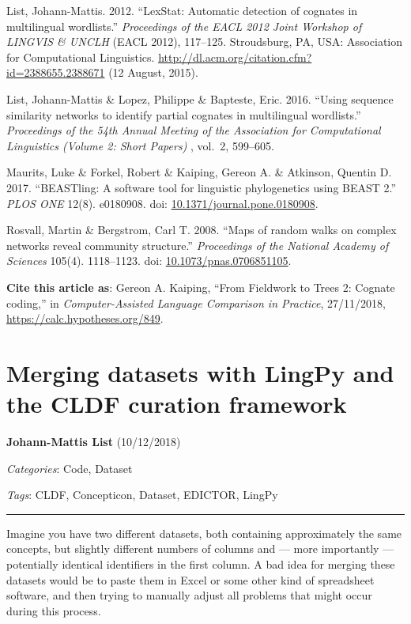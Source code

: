 \documentclass[
  english,
  a4paper,
  oneside,tablecaptionabove
]{scrbook}
\begin{document}
List, Johann-Mattis. 2012. ``LexStat: Automatic detection of cognates
in multilingual wordlists.'' \emph{Proceedings of the EACL 2012 Joint
Workshop of LINGVIS \& UNCLH} (EACL 2012), 117--125. Stroudsburg, PA,
USA: Association for Computational Linguistics.
\url{http://dl.acm.org/citation.cfm?id=2388655.2388671} (12 August,
2015).

List, Johann-Mattis \& Lopez, Philippe \& Bapteste, Eric. 2016.
``Using sequence similarity networks to identify partial cognates in
multilingual wordlists.'' \emph{Proceedings of the 54th Annual Meeting of
the Association for Computational Linguistics (Volume 2: Short Papers)}
, vol.~2, 599--605.

Maurits, Luke \& Forkel, Robert \& Kaiping, Gereon A. \& Atkinson,
Quentin D. 2017. ``BEASTling: A software tool for linguistic phylogenetics
using BEAST 2.'' \emph{PLOS ONE} 12(8). e0180908. doi:
\href{https://doi.org/10.1371/journal.pone.0180908}{10.1371/journal.pone.0180908}.

Rosvall, Martin \& Bergstrom, Carl T. 2008. ``Maps of random walks on
complex networks reveal community structure.'' \emph{Proceedings of the
National Academy of Sciences} 105(4). 1118--1123. doi:
\href{https://doi.org/10.1073/pnas.0706851105}{10.1073/pnas.0706851105}.

\textbf{Cite this article as}: Gereon A. Kaiping, ``From Fieldwork to
Trees 2: Cognate coding,'' in \emph{Computer-Assisted Language Comparison
in Practice}, 27/11/2018, \url{https://calc.hypotheses.org/849}.

\hypertarget{merging-datasets-with-lingpy-and-the-cldf-curation-framework}{%
\chapter{Merging datasets with LingPy and the CLDF curation
framework}\label{merging-datasets-with-lingpy-and-the-cldf-curation-framework}}

\textbf{Johann-Mattis List} (10/12/2018)

\emph{Categories}: Code, Dataset

\emph{Tags}: CLDF, Concepticon, Dataset, EDICTOR, LingPy

\begin{center}\rule{0.5\linewidth}{\linethickness}\end{center}

\leavevmode\hypertarget{markdown}{}%
Imagine you have two different datasets, both containing approximately
the same concepts, but slightly different numbers of columns and ---
more importantly --- potentially identical identifiers in the first
column. A bad idea for merging these datasets would be to paste them in
Excel or some other kind of spreadsheet software, and then trying to
manually adjust all problems that might occur during this process.
\end{document}

